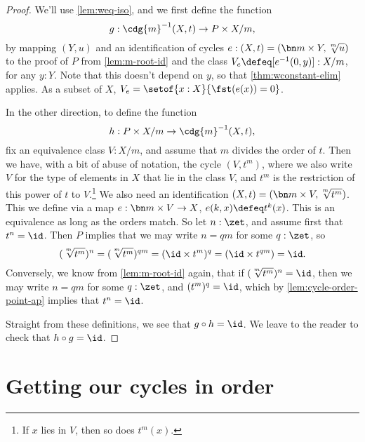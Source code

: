 \begin{proof}
  We'll use \cref{lem:weq-iso}, and we first define the function
  \[
    g : \cdg{m}^{-1}(X,t) \to P\times X/m,
  \]
  by mapping $(Y,u)$ and an identification of cycles
  $e : (X,t) = (\bn m\times Y,\sqrt[\uproot{2}m]{u})$
  to the proof of $P$ from \cref{lem:m-root-id}
  and the class $V_e\defeq [e^{-1}(0,y)]:X/m$, for any $y:Y$.
  Note that this doesn't depend on $y$, so that \cref{thm:wconstant-elim} applies.
  As a subset of $X$, $V_e=\setof{x:X}{\fst(e(x))=0}$.

  In the other direction, to define the function
  \[
    h : P\times X/m \to \cdg{m}^{-1}(X,t),
  \]
  fix an equivalence class $V:X/m$,
  and assume that $m$ divides the order of $t$.
  Then we have, with a bit of abuse of notation, the cycle $(V,t^m)$,
  where we also write $V$ for the type of elements in $X$ that lie in the class $V$,
  and $t^m$ is the restriction of this power of $t$ to $V$.\footnote{%
    If $x$ lies in $V$, then so does $t^m(x)$.}
  We also need an identification
  $(X,t)=(\bn m\times V,\sqrt[\uproot{2}m]{t^m})$.
  This we define via a map $e : \bn m\times V \to X$, $e(k,x) \defeq t^k(x)$.
  This is an equivalence as long as the orders match.
  So let $n:\zet$, and assume first that $t^n=\id$.
  Then $P$ implies that we may write $n=qm$ for some $q:\zet$,
  so
  \[
    (\sqrt[\uproot{2}m]{t^m})^n
    = (\sqrt[\uproot{2}m]{t^m})^{qm}
    = (\id \times t^m)^q = (\id \times t^{qm}) = \id.
  \]
  Conversely, we know from \cref{lem:m-root-id} again,
  that if $(\sqrt[\uproot{2}m]{t^m})^n=\id$,
  then we may write $n=qm$ for some $q:\zet$,
  and $(t^m)^q=\id$, which by \cref{lem:cycle-order-point-ap}
  implies that $t^n = \id$.

  Straight from these definitions, we see that $g\circ h=\id$.
  We leave to the reader to check that $h\circ g=\id$.
\end{proof}

\section{Getting our cycles in order}
\label{sec:cycles-order}

